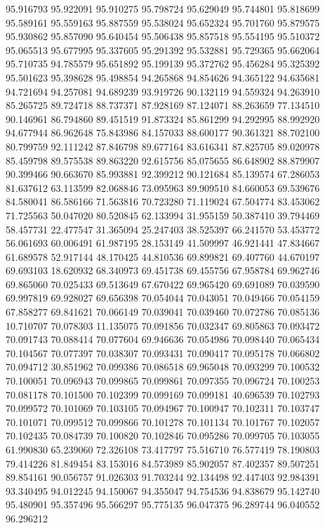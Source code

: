 95.916793
95.922091
95.910275
95.798724
95.629049
95.744801
95.818699
95.589161
95.559163
95.887559
95.538024
95.652324
95.701760
95.879575
95.930862
95.857090
95.640454
95.506438
95.857518
95.554195
95.510372
95.065513
95.677995
95.337605
95.291392
95.532881
95.729365
95.662064
95.710735
94.785579
95.651892
95.199139
95.372762
95.456284
95.325392
95.501623
95.398628
95.498854
94.265868
94.854626
94.365122
94.635681
94.721694
94.257081
94.689239
93.919726
90.132119
94.559324
94.263910
85.265725
89.724718
88.737371
87.928169
87.124071
88.263659
77.134510
90.146961
86.794860
89.451519
91.873324
85.861299
94.292995
88.992920
94.677944
86.962648
75.843986
84.157033
88.600177
90.361321
88.702100
80.799759
92.111242
87.846798
89.677164
83.616341
87.825705
89.020978
85.459798
89.575538
89.863220
92.615756
85.075655
86.648902
88.879907
90.399466
90.663670
85.993881
92.399212
90.121684
85.139574
67.286053
81.637612
63.113599
82.068846
73.095963
89.909510
84.660053
69.539676
84.580041
86.586166
71.563816
70.723280
71.119024
67.504774
83.453062
71.725563
50.047020
80.520845
62.133994
31.955159
50.387410
39.794469
58.457731
22.477547
31.365094
25.247403
38.525397
66.241570
53.453772
56.061693
60.006491
61.987195
28.153149
41.509997
46.921441
47.834667
61.689578
52.917144
48.170425
44.810536
69.899821
69.407760
44.670197
69.693103
18.620932
68.340973
69.451738
69.455756
67.958784
69.962746
69.865060
70.025433
69.513649
67.670422
69.965420
69.691089
70.039590
69.997819
69.928027
69.656398
70.054044
70.043051
70.049466
70.054159
67.858277
69.841621
70.066149
70.039041
70.039460
70.072786
70.085136
10.710707
70.078303
11.135075
70.091856
70.032347
69.805863
70.093472
70.091743
70.088414
70.077604
69.946636
70.054986
70.098440
70.065434
70.104567
70.077397
70.038307
70.093431
70.090417
70.095178
70.066802
70.094712
30.851962
70.099386
70.086518
69.965048
70.093299
70.100532
70.100051
70.096943
70.099865
70.099861
70.097355
70.096724
70.100253
70.081178
70.101500
70.102399
70.099169
70.099181
40.696539
70.102793
70.099572
70.101069
70.103105
70.094967
70.100947
70.102311
70.103747
70.101071
70.099512
70.099866
70.101278
70.101134
70.101767
70.102057
70.102435
70.084739
70.100820
70.102846
70.095286
70.099705
70.103055
61.990830
65.239060
72.326108
73.417797
75.516710
76.577419
78.190803
79.414226
81.849454
83.153016
84.573989
85.902057
87.402357
89.507251
89.854161
90.056757
91.026303
91.703244
92.134498
92.447403
92.984391
93.340495
94.012245
94.150067
94.355047
94.754536
94.838679
95.142740
95.480901
95.357496
95.566297
95.775135
96.047375
96.289744
96.040552
96.296212
